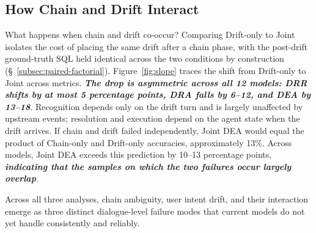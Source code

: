 \subsection{How Chain and Drift Interact}
\label{subsec:interaction-finding}

What happens when chain and drift co-occur? Comparing Drift-only to Joint isolates the cost of placing the same drift after a chain phase, with the post-drift ground-truth SQL held identical across the two conditions by construction (\S~\ref{subsec:paired-factorial}). Figure~\ref{fig:slope} traces the shift from Drift-only to Joint across metrics. \textbf{\textit{The drop is asymmetric across all 12 models: DRR shifts by at most 5 percentage points, DRA falls by 6--12, and DEA by 13--18}}. Recognition depends only on the drift turn and is largely unaffected by upstream events; resolution and execution depend on the agent state when the drift arrives. If chain and drift failed independently, Joint DEA would equal the product of Chain-only and Drift-only accuracies, approximately 13\%. Across models, Joint DEA exceeds this prediction by 10--13 percentage points, \textbf{\textit{indicating that the samples on which the two failures occur largely overlap}}.

Across all three analyses, chain ambiguity, user intent drift, and their interaction emerge as three distinct dialogue-level failure modes that current models do not yet handle consistently and reliably.






